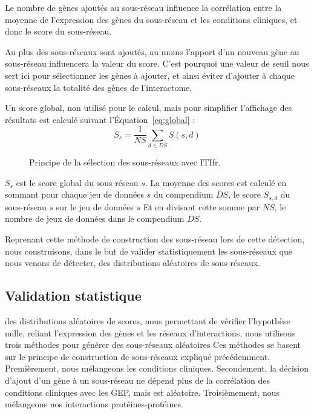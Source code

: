 			Le nombre de gènes ajoutés au sous-réseau influence la corrélation entre la moyenne de l'expression des gènes du sous-réseau et les conditions cliniques, et donc le score du sous-réseau.

\pagebreak

			Au plus des sous-réseaux sont ajoutés, au moins l'apport d'un nouveau gène au sous-réseau influencera la valeur du score.
			C'est pourquoi une valeur de seuil nous sert ici pour sélectionner les gènes à ajouter, et ainsi éviter d'ajouter à chaque sous-réseaux la totalité des gènes de l'interactome.

			Un score global, non utilisé pour le calcul, mais pour simplifier l'affichage des résultats est calculé suivant l'Équation~\ref{eq:global} :
			\begin{equation}\label{eq:global}
				S_{s}=\frac{1}{NS}\sum_{d\in DS}S(s,d)
			\end{equation}

			\begin{figure}
				\begin{center}
					\def\svgwidth{\columnwidth}
					\caption{Principe de la sélection des sous-réseaux avec \acl{ITIfr}.}
					\label{fig:Algorithme}
				\end{center}
			\end{figure}
			$S_{s}$ est le score global du sous-réseau $s$.
			La moyenne des scores est calculé en sommant pour chaque jeu de données $s$ du compendium $DS$, le score $S_{s,d}$ du sous-réseau $s$ sur le jeu de données $s$
			Et en divisant cette somme par $NS$, le nombre de jeux de données dans le compendium $DS$.
		
			Reprenant cette méthode de construction des sous-réseau lors de cette détection, nous construisons, dans le but de valider statistiquement les sous-réseaux que nous venons de détecter, des distributions aléatoires de sous-réseaux.

		\subsection{\textcolor{green!45!black}{Validation statistique}}\label{sec:Validation}
			 des distributions aléatoires de scores, nous permettant de vérifier l'hypothèse nulle, reliant l'expression des gènes et les réseaux d'interactions, nous utilisons trois méthodes pour générer des sous-réseaux aléatoires
			Ces méthodes se basent sur le principe de construction de sous-réseaux expliqué précédemment.
			Premièrement, nous mélangeons les conditions cliniques.
			Secondement, la décision d'ajout d'un gène à un sous-réseau ne dépend plus de la corrélation des conditions cliniques avec les \acs{GEP}, mais est aléatoire.
			Troisièmement, nous mélangeons nos interactions protéines-protéines.
			
